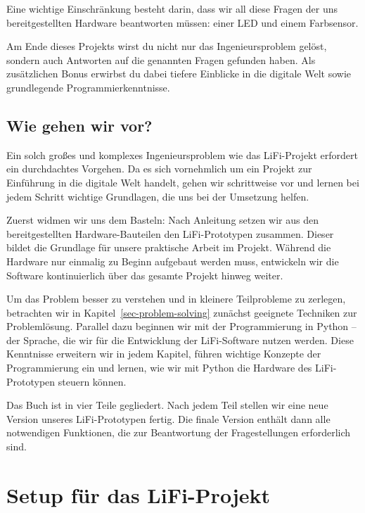 \documentclass[
  letterpaper,
  DIV=11]{scrreprt}
\begin{document}
Eine wichtige Einschränkung besteht darin, dass wir all diese Fragen der
uns bereitgestellten Hardware beantworten müssen: einer LED und einem
Farbsensor.

Am Ende dieses Projekts wirst du nicht nur das Ingenieursproblem gelöst,
sondern auch Antworten auf die genannten Fragen gefunden haben. Als
zusätzlichen Bonus erwirbst du dabei tiefere Einblicke in die digitale
Welt sowie grundlegende Programmierkenntnisse.

\section*{Wie gehen wir vor?}\label{wie-gehen-wir-vor}


Ein solch großes und komplexes Ingenieursproblem wie das LiFi-Projekt
erfordert ein durchdachtes Vorgehen. Da es sich vornehmlich um ein
Projekt zur Einführung in die digitale Welt handelt, gehen wir
schrittweise vor und lernen bei jedem Schritt wichtige Grundlagen, die
uns bei der Umsetzung helfen.

Zuerst widmen wir uns dem Basteln: Nach Anleitung setzen wir aus den
bereitgestellten Hardware-Bauteilen den LiFi-Prototypen zusammen. Dieser
bildet die Grundlage für unsere praktische Arbeit im Projekt. Während
die Hardware nur einmalig zu Beginn aufgebaut werden muss, entwickeln
wir die Software kontinuierlich über das gesamte Projekt hinweg weiter.

Um das Problem besser zu verstehen und in kleinere Teilprobleme zu
zerlegen, betrachten wir in Kapitel~\ref{sec-problem-solving} zunächst
geeignete Techniken zur Problemlösung. Parallel dazu beginnen wir mit
der Programmierung in Python -- der Sprache, die wir für die Entwicklung
der LiFi-Software nutzen werden. Diese Kenntnisse erweitern wir in jedem
Kapitel, führen wichtige Konzepte der Programmierung ein und lernen, wie
wir mit Python die Hardware des LiFi-Prototypen steuern können.

Das Buch ist in vier Teile gegliedert. Nach jedem Teil stellen wir eine
neue Version unseres LiFi-Prototypen fertig. Die finale Version enthält
dann alle notwendigen Funktionen, die zur Beantwortung der
Fragestellungen erforderlich sind.


\chapter*{Setup für das LiFi-Projekt}\label{sec-lifi-project-setup}
\end{document}
